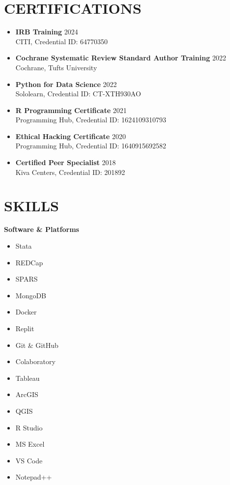 \documentclass[a4paper,12pt]{article}
\begin{document}
{\section{CERTIFICATIONS}
\begin{itemize}
    \item \textbf{IRB Training} \hfill 2024 \\
    CITI, Credential ID: 64770350
    \item \textbf{Cochrane Systematic Review Standard Author Training} \hfill 2022 \\
    Cochrane, Tufts University
    \item \textbf{Python for Data Science} \hfill 2022 \\
    Sololearn, Credential ID: CT-XTH930AO
    \item \textbf{R Programming Certificate} \hfill 2021 \\
    Programming Hub, Credential ID: 1624109310793
    \item \textbf{Ethical Hacking Certificate} \hfill 2020 \\
    Programming Hub, Credential ID: 1640915692582
    \item \textbf{Certified Peer Specialist} \hfill 2018 \\
    Kiva Centers, Credential ID: 201892
\end{itemize}

\section{SKILLS}
\begin{center}
\textbf{Software \& Platforms} \\
\end{center}
\begin{multicols}{4}
\begin{itemize}
  \item Stata
  \item REDCap
  \item SPARS
  \item MongoDB
  \item Docker
  \item Replit
  \item Git \& GitHub
  \item Colaboratory
  \item Tableau
  \item ArcGIS
  \item QGIS
  \item R Studio
  \item MS Excel
  \item VS Code
  \item Notepad++
\end{itemize}
\end{multicols}

}
\end{document}
